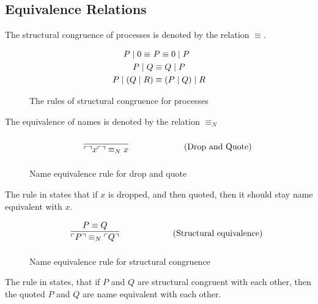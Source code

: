 \subsection{Equivalence Relations}
The structural congruence of processes is denoted by the relation $\equiv$.

\begin{figure}[h]
    \begin{align*}
        P\mid 0 \equiv\ &P \equiv 0\mid P\\
        P\mid Q &\equiv Q\mid P\\
        P\mid (Q\mid R)&\equiv (P\mid Q)\mid R
    \end{align*}
    \caption{The rules of structural congruence for processes}
\end{figure}


\FloatBarrier

The equivalence of names is denoted by the relation $\equiv _N$

\begin{figure}[h]
	\begin{align}
	& \infrule{}{\quot{\drop{x}}\equiv _N x} \tag{Drop and Quote}
	\end{align}
	\caption{Name equivalence rule for drop and quote}
	\label{fig:dropquot}
\end{figure}

\noindent
The rule in  states that if $x$ is dropped, and then quoted, then it should stay name equivalent with $x$.

\begin{figure}[h]
	\begin{align}
	& \infrule{P\equiv Q}{\quot{P} \equiv _N \quot{Q}} \tag{Structural equivalence}
	\end{align}
	\caption{Name equivalence rule for structural congruence}
	\label{fig:strucequiv}
\end{figure}

\noindent
The rule in  states, that if $P$ and $Q$ are structural congruent with each other, then the quoted $P$ and $Q$ are name equivalent with each other.


